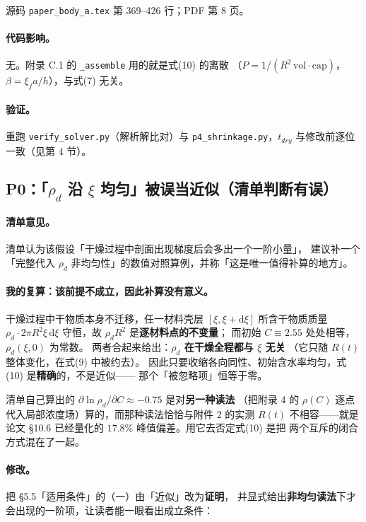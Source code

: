 \documentclass[11pt,a4paper]{ctexart}
\newcommand{\src}[1]{\texttt{#1}}
\newcommand{\loc}[1]{\textcolor{blue!60!black}{#1}}
\begin{document}
\noindent \loc{源码 \src{paper\_body\_a.tex} 第 369--426 行；PDF 第 8 页}。

\paragraph{代码影响。}无。附录 C.1 的 \src{\_assemble} 用的就是式(10) 的离散
（$P=1/(R^2\,\mathrm{vol}\cdot \mathrm{cap})$，$\beta=\xi_f a/h$），与式(7) 无关。

\paragraph{验证。}重跑 \src{verify\_solver.py}（解析解比对）与
\src{p4\_shrinkage.py}，$t_{dry}$ 与修改前逐位一致（见第 4 节）。

\subsection{P0：「$\rho_d$ 沿 $\xi$ 均匀」被误当近似（清单判断有误）}

\paragraph{清单意见。}清单认为该假设「干燥过程中剖面出现梯度后会多出一个一阶小量」，
建议补一个「完整代入 $\rho_d$ 非均匀性」的数值对照算例，并称「这是唯一值得补算的地方」。

\paragraph{我的复算：该前提不成立，因此补算没有意义。}
干燥过程中干物质本身不迁移，任一材料壳层 $[\xi,\xi+\mathrm{d}\xi]$ 所含干物质质量
$\rho_d\cdot 2\pi R^2\xi\,\mathrm{d}\xi$ 守恒，故 $\rho_dR^2$ 是\textbf{逐材料点的不变量}；
而初始 $C\equiv2.55$ 处处相等，$\rho_d(\xi,0)$ 为常数。
两者合起来给出：\textbf{$\rho_d$ 在干燥全程都与 $\xi$ 无关}
（它只随 $R(t)$ 整体变化，在式(9) 中被约去）。
因此只要收缩各向同性、初始含水率均匀，式(10) 是\textbf{精确}的，不是近似——
那个「被忽略项」恒等于零。

清单自己算出的 $\partial\ln\rho_d/\partial C\approx-0.75$ 是对\textbf{另一种读法}
（把附录 4 的 $\rho(C)$ 逐点代入局部浓度场）算的，而那种读法恰恰与附件 2 的实测
$R(t)$ 不相容——就是论文 §10.6 已经量化的 $17.8\%$ 峰值偏差。用它去否定式(10) 是把
两个互斥的闭合方式混在了一起。

\paragraph{修改。}把 §5.5「适用条件」的（一）由「近似」改为\textbf{证明}，
并显式给出\textbf{非均匀读法}下才会出现的一阶项，让读者能一眼看出成立条件：
\end{document}
